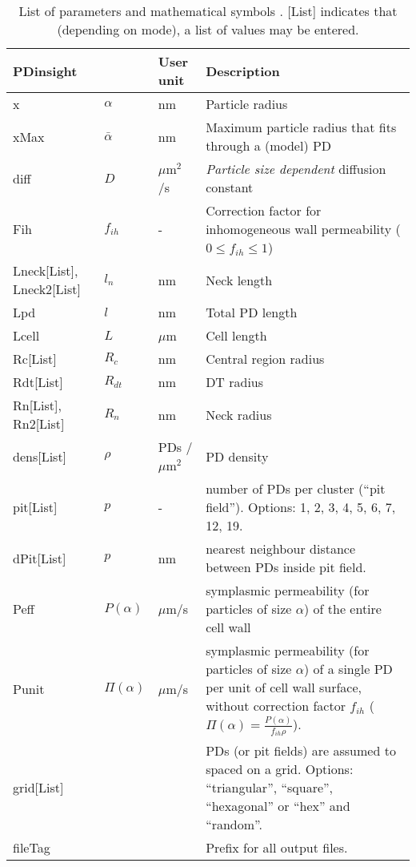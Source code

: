 \documentclass[a4paper,12pt]{article}
\newcommand{\SEL}{\bar{\alpha}}
\newcommand{\patchy}{f_{ih}}
\begin{document}
\begin{table}
\caption{List of parameters and mathematical symbols \citep{Deinum.e19}. [List] indicates that (depending on mode), a list of values may be entered.}
\label{tab:pars}
\begin{tabular}{l l l p{}}
PDinsight&& User unit & Description\\
\hline
x&$\alpha$ & nm &Particle radius \\
xMax &$\SEL$ & nm &Maximum particle radius that fits through a (model) PD \\
diff&$D$ &  $\mu$m$^2$/s &\emph{Particle size dependent} diffusion constant\\
Fih&$\patchy$ & - & Correction factor for inhomogeneous wall permeability ($0\leq\patchy\leq1$)\\
Lneck[List], Lneck2[List]&$l_n$ & nm& Neck length\\
Lpd&$l$ & nm &Total PD length\\
Lcell&$L$ & $\mu$m &Cell length\\
Rc[List]&$R_c$ &  nm & Central region radius\\
Rdt[List]&$R_{dt}$ &  nm & DT radius\\
Rn[List], Rn2[List]&$R_n$ &  nm & Neck radius\\
dens[List]&$\rho$ & PDs /$\mu$m$^2$ & PD density\\
pit[List]&$p$ & - & number of PDs per cluster (``pit field''). Options: 1, 2, 3, 4, 5, 6, 7, 12, 19.\\
dPit[List]&$p$ & nm & nearest neighbour distance between PDs inside pit field. \\ 
Peff&$P(\alpha)$ &$\mu$m/s& symplasmic permeability (for particles of size $\alpha$) of the entire cell wall\\
Punit&$\Pi(\alpha)$ &$\mu$m/s& symplasmic permeability (for particles of size $\alpha$) of a single PD per unit of cell wall surface, without correction factor $\patchy$ ($\Pi(\alpha) = \frac{P(\alpha)}{\patchy\rho}$).\\
grid[List]&&&PDs (or pit fields) are assumed to spaced on a grid. Options: ``triangular'', ``square'', ``hexagonal'' or ``hex'' and ``random''.\\
fileTag &&& Prefix for all output files. \\
\end{tabular}
\end{table}
\end{document}
